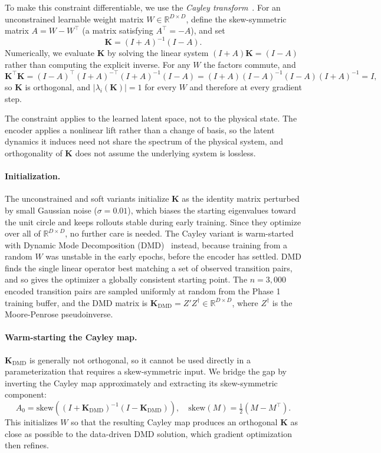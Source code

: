 \documentclass[10pt]{article} %
\newcommand{\K}{\mathbf{K}}
\begin{document}
To make this constraint differentiable, we use the \emph{Cayley transform}~\citep{Erichson2019}. For an unconstrained learnable weight matrix $W \in \mathbb{R}^{D\times D}$, define the skew-symmetric matrix $A = W - W^\top$ (a matrix satisfying $A^\top = -A$), and set
\begin{equation}
  \K = (I + A)^{-1}(I - A).
  \label{eq:cayley}
\end{equation}
Numerically, we evaluate $\K$ by solving the linear system $(I+A)\K = (I-A)$ rather than computing the explicit inverse. For any $W$ the factors commute, and
\begin{equation}
    \K^\top\K
    = (I - A)^\top (I + A)^{-\top} (I + A)^{-1} (I - A)
    = (I + A) (I - A)^{-1} (I - A) (I + A)^{-1}
    = I,
\end{equation}
so $\K$ is orthogonal, and $|\lambda_i(\K)| = 1$ for every $W$ and therefore at every gradient step.

The constraint applies to the learned latent space, not to the physical state. The encoder applies a nonlinear lift rather than a change of basis, so the latent dynamics it induces need not share the spectrum of the physical system, and orthogonality of $\K$ does not assume the underlying system is lossless.

\paragraph{Initialization.}
The unconstrained and soft variants initialize $\K$ as the identity matrix perturbed by small Gaussian noise ($\sigma = 0.01$), which biases the starting eigenvalues toward the unit circle and keeps rollouts stable during early training. Since they optimize over all of $\mathbb{R}^{D\times D}$, no further care is needed. The Cayley variant is warm-started with Dynamic Mode Decomposition (DMD)~\citep{Schmid2010} instead, because training from a random $W$ was unstable in the early epochs, before the encoder has settled. DMD finds the single linear operator best matching a set of observed transition pairs, and so gives the optimizer a globally consistent starting point. The $n{=}3{,}000$ encoded transition pairs are sampled uniformly at random from the Phase 1 training buffer, and the DMD matrix is $\K_\text{DMD} = Z' Z^\dagger \in \mathbb{R}^{D\times D}$, where $Z^\dagger$ is the Moore-Penrose pseudoinverse.

\paragraph{Warm-starting the Cayley map.}
$\K_\text{DMD}$ is generally not orthogonal, so it cannot be used directly in a parameterization that requires a skew-symmetric input. We bridge the gap by inverting the Cayley map approximately and extracting its skew-symmetric component:
\begin{equation}
  A_0 = \mathrm{skew}\!\left((I + \K_\text{DMD})^{-1}(I - \K_\text{DMD})\right),
  \quad
  \mathrm{skew}(M) = \tfrac{1}{2}(M - M^\top).
\end{equation}
This initializes $W$ so that the resulting Cayley map produces an orthogonal $\K$ as close as possible to the data-driven DMD solution, which gradient optimization then refines.
\end{document}
